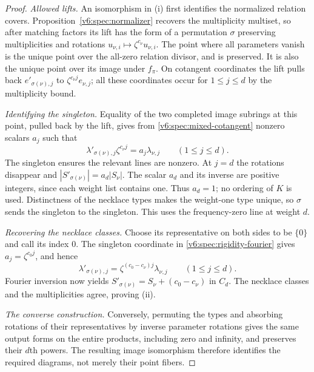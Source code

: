 \documentclass[10pt,fleqn]{article}
\numberwithin{equation}{section}
\begin{document}
\begin{proof}
\emph{Allowed lifts.}
An isomorphism in (i) first identifies the normalized relation covers.
Proposition~\ref{v6:spec:normalizer} recovers the multiplicity multiset,
so after matching factors its lift has the form of a permutation
$\sigma$ preserving multiplicities and rotations
$u_{\nu,i}\mapsto\zeta^{c_\nu}u_{\nu,i}$.  The point where all
parameters vanish is the unique point over the all-zero relation
divisor, and is preserved.  It is also the unique point over its image
under $f_\pi$.  On cotangent coordinates the lift pulls back
$e'_{\sigma(\nu),j}$ to $\zeta^{c_\nu j}e_{\nu,j}$; all these
coordinates occur for $1\le j\le d$ by the multiplicity bound.

\emph{Identifying the singleton.}
Equality of the two completed image subrings at this point, pulled back
by the lift, gives from \eqref{v6:spec:mixed-cotangent} nonzero scalars
$a_j$ such that
\begin{equation}\label{v6:spec:rigidity-fourier}
 \lambda'_{\sigma(\nu),j}\zeta^{c_\nu j}
       =a_j\lambda_{\nu,j}\qquad(1\le j\le d).
\end{equation}
The singleton ensures the relevant lines are nonzero.  At $j=d$ the
rotations disappear and $|S'_{\sigma(\nu)}|=a_d|S_\nu|$.  The scalar
$a_d$ and its inverse are positive integers, since each weight list
contains one.  Thus $a_d=1$; no ordering of $K$ is used.  Distinctness of the necklace
types makes the weight-one type unique, so $\sigma$ sends the singleton
to the singleton.  This uses the frequency-zero line at weight $d$.

\emph{Recovering the necklace classes.}
Choose its representative on both sides to be $\{0\}$ and call its
index $0$.  The singleton coordinate in
\eqref{v6:spec:rigidity-fourier} gives $a_j=\zeta^{c_0j}$, and hence
\[
 \lambda'_{\sigma(\nu),j}
 =\zeta^{(c_0-c_\nu)j}\lambda_{\nu,j}\qquad(1\le j\le d).
\]
Fourier inversion now yields
$S'_{\sigma(\nu)}=S_\nu+(c_0-c_\nu)$ in $C_d$.  The necklace
classes and the multiplicities agree, proving (ii).

\emph{The converse construction.}
Conversely,
permuting the types and absorbing rotations of their representatives
by inverse parameter rotations gives the same output forms on the
entire products, including zero and infinity, and preserves their
$d$th powers.  The resulting image isomorphism therefore identifies
the required diagrams, not merely their point fibers.
\end{proof}
\end{document}
